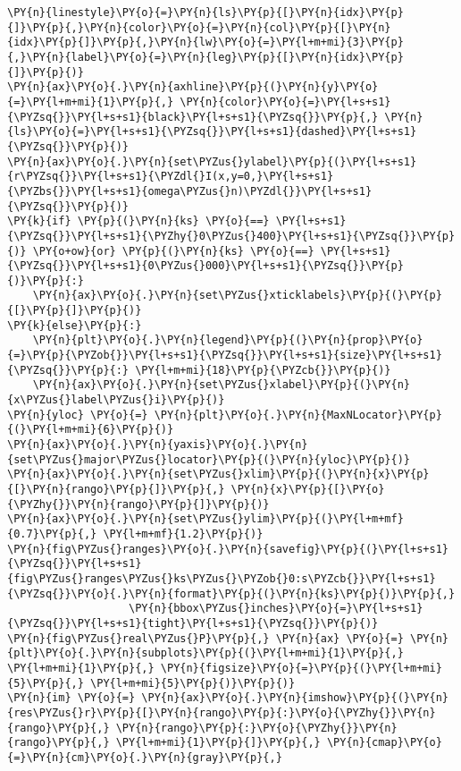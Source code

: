 \begin{Verbatim}[commandchars=\\\{\}]
            \PY{n}{linestyle}\PY{o}{=}\PY{n}{ls}\PY{p}{[}\PY{n}{idx}\PY{p}{]}\PY{p}{,}\PY{n}{color}\PY{o}{=}\PY{n}{col}\PY{p}{[}\PY{n}{idx}\PY{p}{]}\PY{p}{,}\PY{n}{lw}\PY{o}{=}\PY{l+m+mi}{3}\PY{p}{,}\PY{n}{label}\PY{o}{=}\PY{n}{leg}\PY{p}{[}\PY{n}{idx}\PY{p}{]}\PY{p}{)}
\PY{n}{ax}\PY{o}{.}\PY{n}{axhline}\PY{p}{(}\PY{n}{y}\PY{o}{=}\PY{l+m+mi}{1}\PY{p}{,} \PY{n}{color}\PY{o}{=}\PY{l+s+s1}{\PYZsq{}}\PY{l+s+s1}{black}\PY{l+s+s1}{\PYZsq{}}\PY{p}{,} \PY{n}{ls}\PY{o}{=}\PY{l+s+s1}{\PYZsq{}}\PY{l+s+s1}{dashed}\PY{l+s+s1}{\PYZsq{}}\PY{p}{)}
\PY{n}{ax}\PY{o}{.}\PY{n}{set\PYZus{}ylabel}\PY{p}{(}\PY{l+s+s1}{r\PYZsq{}}\PY{l+s+s1}{\PYZdl{}I(x,y=0,}\PY{l+s+s1}{\PYZbs{}}\PY{l+s+s1}{omega\PYZus{}n)\PYZdl{}}\PY{l+s+s1}{\PYZsq{}}\PY{p}{)}
\PY{k}{if} \PY{p}{(}\PY{n}{ks} \PY{o}{==} \PY{l+s+s1}{\PYZsq{}}\PY{l+s+s1}{\PYZhy{}0\PYZus{}400}\PY{l+s+s1}{\PYZsq{}}\PY{p}{)} \PY{o+ow}{or} \PY{p}{(}\PY{n}{ks} \PY{o}{==} \PY{l+s+s1}{\PYZsq{}}\PY{l+s+s1}{0\PYZus{}000}\PY{l+s+s1}{\PYZsq{}}\PY{p}{)}\PY{p}{:}
    \PY{n}{ax}\PY{o}{.}\PY{n}{set\PYZus{}xticklabels}\PY{p}{(}\PY{p}{[}\PY{p}{]}\PY{p}{)}
\PY{k}{else}\PY{p}{:}
    \PY{n}{plt}\PY{o}{.}\PY{n}{legend}\PY{p}{(}\PY{n}{prop}\PY{o}{=}\PY{p}{\PYZob{}}\PY{l+s+s1}{\PYZsq{}}\PY{l+s+s1}{size}\PY{l+s+s1}{\PYZsq{}}\PY{p}{:} \PY{l+m+mi}{18}\PY{p}{\PYZcb{}}\PY{p}{)}
    \PY{n}{ax}\PY{o}{.}\PY{n}{set\PYZus{}xlabel}\PY{p}{(}\PY{n}{x\PYZus{}label\PYZus{}i}\PY{p}{)}
\PY{n}{yloc} \PY{o}{=} \PY{n}{plt}\PY{o}{.}\PY{n}{MaxNLocator}\PY{p}{(}\PY{l+m+mi}{6}\PY{p}{)}
\PY{n}{ax}\PY{o}{.}\PY{n}{yaxis}\PY{o}{.}\PY{n}{set\PYZus{}major\PYZus{}locator}\PY{p}{(}\PY{n}{yloc}\PY{p}{)}
\PY{n}{ax}\PY{o}{.}\PY{n}{set\PYZus{}xlim}\PY{p}{(}\PY{n}{x}\PY{p}{[}\PY{n}{rango}\PY{p}{]}\PY{p}{,} \PY{n}{x}\PY{p}{[}\PY{o}{\PYZhy{}}\PY{n}{rango}\PY{p}{]}\PY{p}{)}
\PY{n}{ax}\PY{o}{.}\PY{n}{set\PYZus{}ylim}\PY{p}{(}\PY{l+m+mf}{0.7}\PY{p}{,} \PY{l+m+mf}{1.2}\PY{p}{)}
\PY{n}{fig\PYZus{}ranges}\PY{o}{.}\PY{n}{savefig}\PY{p}{(}\PY{l+s+s1}{\PYZsq{}}\PY{l+s+s1}{fig\PYZus{}ranges\PYZus{}ks\PYZus{}\PYZob{}0:s\PYZcb{}}\PY{l+s+s1}{\PYZsq{}}\PY{o}{.}\PY{n}{format}\PY{p}{(}\PY{n}{ks}\PY{p}{)}\PY{p}{,}
                   \PY{n}{bbox\PYZus{}inches}\PY{o}{=}\PY{l+s+s1}{\PYZsq{}}\PY{l+s+s1}{tight}\PY{l+s+s1}{\PYZsq{}}\PY{p}{)}
\PY{n}{fig\PYZus{}real\PYZus{}P}\PY{p}{,} \PY{n}{ax} \PY{o}{=} \PY{n}{plt}\PY{o}{.}\PY{n}{subplots}\PY{p}{(}\PY{l+m+mi}{1}\PY{p}{,} \PY{l+m+mi}{1}\PY{p}{,} \PY{n}{figsize}\PY{o}{=}\PY{p}{(}\PY{l+m+mi}{5}\PY{p}{,} \PY{l+m+mi}{5}\PY{p}{)}\PY{p}{)}
\PY{n}{im} \PY{o}{=} \PY{n}{ax}\PY{o}{.}\PY{n}{imshow}\PY{p}{(}\PY{n}{res\PYZus{}r}\PY{p}{[}\PY{n}{rango}\PY{p}{:}\PY{o}{\PYZhy{}}\PY{n}{rango}\PY{p}{,} \PY{n}{rango}\PY{p}{:}\PY{o}{\PYZhy{}}\PY{n}{rango}\PY{p}{,} \PY{l+m+mi}{1}\PY{p}{]}\PY{p}{,} \PY{n}{cmap}\PY{o}{=}\PY{n}{cm}\PY{o}{.}\PY{n}{gray}\PY{p}{,}

\end{Verbatim}
